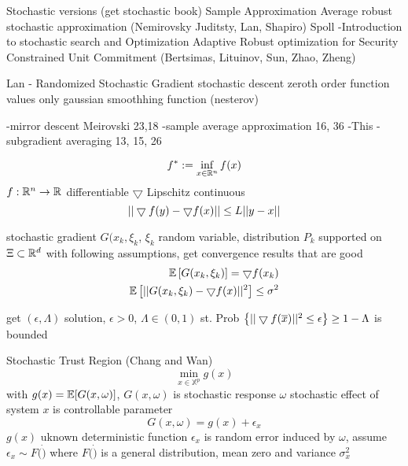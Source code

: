
Stochastic versions (get stochastic book)
Sample Approximation Average
robust stochastic approximation (Nemirovsky Juditsty, Lan, Shapiro)
Spoll  -Introduction to stochastic search and Optimization
Adaptive Robust optimization for Security Constrained Unit Commitment  (Bertsimas, Lituinov, Sun, Zhao, Zheng)


Lan -  Randomized Stochastic Gradient
stochastic descent
zeroth order function values only
gaussian smoothhing function  (nesterov)

-mirror descent Meirovski 23,18
-sample average approximation 16, 36
-This
-subgradient averaging 13, 15, 26

\begin{equation}
f^* := \inf_{x \in \mathbb{R}^{n}} f(x)
\end{equation}
$f: \mathbb{R}^{n} \rightarrow \mathbb{R}^{}$ differentiable
$\bigtriangledown$ Lipschitz continuous
\begin{equation}
|| \bigtriangledown f(y) - \bigtriangledown f (x) || \le L || y - x ||
\end{equation}

stochastic gradient
$G (x_k, \xi_k$, $\xi_k$ random variable, distribution $P_k$ supported on $\Xi \subset \mathbb{R}^{d}$
with following assumptions, get convergence results that are good
\begin{align}
\mathbb{E} \left[ G(x_k,\xi_k) \right] = \bigtriangledown f (x_k)		\\
\mathbb{E} \left[ || G(x_k,\xi_k) - \bigtriangledown f(x)||^2 \right] \le \sigma^2
\end{align}

get $(\epsilon, \Lambda)$ solution, $\epsilon > 0$, $\Lambda \in (0,1)$
st.
Prob $\left\{ || \bigtriangledown f(\overline{x}) ||^2 \le \epsilon \right\} \ge 1-\Lambda$
is bounded




Stochastic Trust Region	(Chang and Wan) \cite{chang_2009}
\begin{equation}
\min_{x \in \mathbb{X}^p} g(x)
\end{equation}
with $g(x) = \mathbb{E} [ G(x,\omega) ]$, 
$G(x, \omega)$ is stochastic response
$\omega$ stochastic effect of system
$x$ is controllable parameter
\begin{equation}
G(x, \omega) = g(x) + \epsilon_x
\end{equation}
$g(x)$ uknown deterministic function
$\epsilon_x$ is random error induced by $\omega$, assume $\epsilon_x \sim F( \dot )$ where 
$F( \dot )$ is a general distribution, mean zero and variance $\sigma_x^2$

